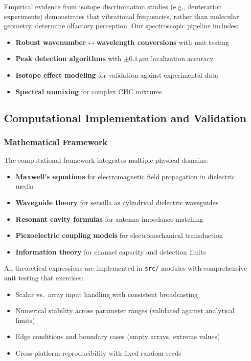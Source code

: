 \documentclass[
  13pt,
  a4paperpaper,
  12pt]{article}
\newcommand{\passthrough}[1]{#1}
\providecommand{\tightlist}{%
  \setlength{\itemsep}{0pt}\setlength{\parskip}{0pt}}
\begin{document}
Empirical evidence from isotope discrimination studies (e.g.,
deuteration experiments) demonstrates that vibrational frequencies,
rather than molecular geometry, determine olfactory perception. Our
spectroscopic pipeline includes:

\begin{itemize}
\tightlist
\item
  \textbf{Robust wavenumber\(\leftrightarrow\)wavelength conversions}
  with unit testing
\item
  \textbf{Peak detection algorithms} with \(\pm 0.1\,\mu\mathrm{m}\)
  localization accuracy
\item
  \textbf{Isotope effect modeling} for validation against experimental
  data
\item
  \textbf{Spectral unmixing} for complex CHC mixtures
\end{itemize}

\subsection{Computational Implementation and
Validation}\label{computational-implementation-and-validation}

\subsubsection{Mathematical Framework}\label{mathematical-framework}

The computational framework integrates multiple physical domains:

\begin{itemize}
\tightlist
\item
  \textbf{Maxwell's equations} for electromagnetic field propagation in
  dielectric media
\item
  \textbf{Waveguide theory} for sensilla as cylindrical dielectric
  waveguides
\item
  \textbf{Resonant cavity formulas} for antenna impedance matching
\item
  \textbf{Piezoelectric coupling models} for electromechanical
  transduction
\item
  \textbf{Information theory} for channel capacity and detection limits
\end{itemize}

All theoretical expressions are implemented in
\passthrough{\lstinline!src/!} modules with comprehensive unit testing
that exercises:

\begin{itemize}
\tightlist
\item
  Scalar vs.~array input handling with consistent broadcasting
\item
  Numerical stability across parameter ranges (validated against
  analytical limits)
\item
  Edge conditions and boundary cases (empty arrays, extreme values)
\item
  Cross-platform reproducibility with fixed random seeds
\end{itemize}
\end{document}
